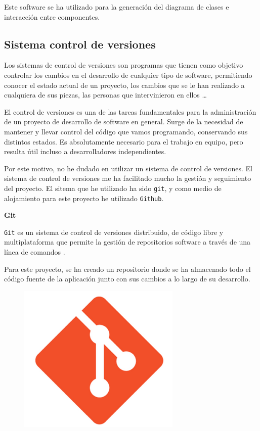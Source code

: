 Este software se ha utilizado para la generación del diagrama de clases e interacción entre componentes.

\newpage

\subsection{Sistema control de versiones}

Los sistemas de control de versiones \cite{ref9} son programas que tienen como objetivo controlar los cambios en el desarrollo de cualquier tipo de software, permitiendo conocer el estado actual de un proyecto, los cambios que se le han realizado a cualquiera de sus piezas, las personas que intervinieron en ellos \ldots

El control de versiones es una de las tareas fundamentales para la administración de un proyecto de desarrollo de software en general. Surge de la necesidad de mantener y llevar control del código que vamos programando, conservando sus distintos estados. Es absolutamente necesario para el trabajo en equipo, pero resulta útil incluso a desarrolladores independientes. 

Por este motivo, no he dudado en utilizar un sistema de control de versiones. El sistema de control de versiones me ha facilitado mucho la gestión y seguimiento del proyecto. El sitema que he utilizado ha sido \texttt{git}, y como medio de alojamiento para este proyecto he utilizado  \texttt{Github}.

\textbf{Git}

\texttt{Git} \cite{ref10}  es un sistema de control de versiones distribuido, de código libre y multiplataforma que permite la gestión de repositorios software a través de una línea de comandos \cite{ref9}.

Para este proyecto, se ha creado un repositorio donde se ha almacenado todo el código fuente de la aplicación junto con sus cambios a lo largo de su desarrollo.

\begin{figure}[h]
	\centering
	\includegraphics[scale=0.25]{images/6}
\end{figure}

